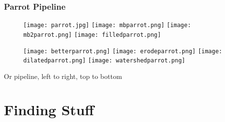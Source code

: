 \documentclass[compress]{beamer}
\begin{document}
\begin{frame}
\frametitle{Parrot Pipeline}
 \begin{figure}
     \texttt{[image: parrot.jpg]}
     \quad
     \texttt{[image: mbparrot.png]}
     \quad
     \texttt{[image: mb2parrot.png]}
     \quad
     \texttt{[image: filledparrot.png]}
 \end{figure}
 \begin{figure}
     \texttt{[image: betterparrot.png]}
     \quad
     \texttt{[image: erodeparrot.png]}
     \quad
     \texttt{[image: dilatedparrot.png]}
     \quad
     \texttt{[image: watershedparrot.png]}
 \end{figure}

\tiny{Or pipeline, left to right, top to bottom}
\end{frame}

\section{Finding Stuff}

\end{document}

